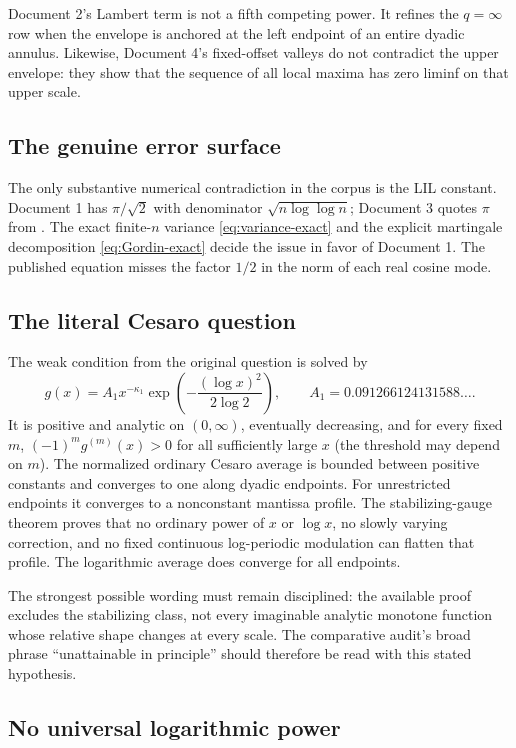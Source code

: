 \documentclass[11pt,oneside]{article}
\theoremstyle{definition}
\theoremstyle{remark}
\begin{document}
Document 2's Lambert term is not a fifth competing power.  It refines the $q=\infty$ row
when the envelope is anchored at the left endpoint of an entire dyadic annulus.  Likewise,
Document 4's fixed-offset valleys do not contradict the upper envelope: they show that the
sequence of all local maxima has zero liminf on that upper scale.

\subsection{The genuine error surface}

The only substantive numerical contradiction in the corpus is the LIL constant.  Document 1
has $\pi/\sqrt2$ with denominator $\sqrt{n\log\log n}$; Document 3 quotes $\pi$ from
\cite{ahl2017}.  The exact finite-$n$ variance \eqref{eq:variance-exact} and the explicit
martingale decomposition \eqref{eq:Gordin-exact} decide the issue in favor of Document 1.
The published equation misses the factor $1/2$ in the norm of each real cosine mode.

\subsection{The literal Cesaro question}

The weak condition from the original question is solved by
\[
 g(x)=A_1x^{-\kappa_1}
 \exp\!\left(-\frac{(\log x)^2}{2\log2}\right),
 \qquad A_1=0.091266124131588\ldots .
\]
It is positive and analytic on $(0,\infty)$, eventually decreasing, and for every fixed
$m$, $(-1)^mg^{(m)}(x)>0$ for all sufficiently large $x$ (the threshold may depend on $m$).
The normalized ordinary Cesaro average is bounded between positive constants and converges
to one along dyadic endpoints.  For unrestricted endpoints it converges to a nonconstant
mantissa profile.  The stabilizing-gauge theorem proves that no ordinary power of $x$ or
$\log x$, no slowly varying correction, and no fixed continuous log-periodic modulation can
flatten that profile.  The logarithmic average does converge for all endpoints.

The strongest possible wording must remain disciplined: the available proof excludes the
stabilizing class, not every imaginable analytic monotone function whose relative shape
changes at every scale.  The comparative audit's broad phrase ``unattainable in principle''
should therefore be read with this stated hypothesis.

\subsection{No universal logarithmic power}
\end{document}

